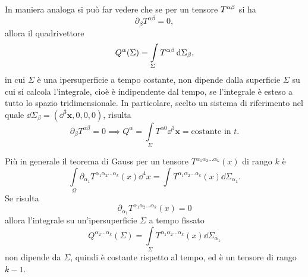 In maniera analoga si può far vedere che se per un tensore
$\tensor{T}{^{\alpha\beta}}$ si ha
\begin{equation}
  \partial_{\beta}T^{\alpha\beta} = 0,
\end{equation}
allora il quadrivettore
\begin{equation}
  Q^{\alpha}(\Sigma) = \int\limits_{\Sigma} \tensor{T}{^{\alpha\beta}}\dd
  \Sigma_{\beta},
\end{equation}
in cui $\Sigma$ è una ipersuperficie a tempo costante, non dipende dalla
superficie $\Sigma$ su cui si calcola l'integrale, cioè è indipendente dal
tempo, se l'integrale è esteso a tutto lo spazio tridimensionale.  In
particolare, scelto un sistema di riferimento nel quale
$\dd\Sigma_{\beta} = (\dd^{3} \bm{x}, 0, 0, 0)$, risulta
\begin{equation}
  \partial_{\beta}T^{\alpha\beta} = 0 \implies Q^{\alpha} = \int\limits_{\Sigma}
  T^{\alpha0} \dd^{3} \bm{x} = \text{costante in $t$}.
\end{equation}

Più in generale il teorema di Gauss per un tensore
$T^{\alpha_{1}\alpha_{2}\dots\alpha_{k}}(x)$ di rango $k$ è
\begin{equation}
  \int\limits_{\Omega} \partial_{\alpha_{1}}
  T^{\alpha_{1}\alpha_{2}\dots\alpha_{k}}(x) \dd^{4} x = \int
  T^{\alpha_{1}\alpha_{2}\dots\alpha_{k}}(x) \dd\Sigma_{\alpha_{1}}.
\end{equation}
Se risulta
\begin{equation}
  \partial_{\alpha_{1}} T^{\alpha_{1}\alpha_{2}\dots\alpha_{k}}(x) = 0
\end{equation}
allora l'integrale su un'ipersuperficie $\Sigma$ a tempo fissato
\begin{equation}
  Q^{\alpha_{2}\dots\alpha_{k}}(\Sigma) = \int\limits_{\Sigma}
  T^{\alpha_{1}\alpha_{2}\dots\alpha_{k}}(x) \dd\Sigma_{\alpha_{1}}
\end{equation}
non dipende da $\Sigma$, quindi è costante rispetto al tempo, ed è un tensore di
rango $k-1$.

